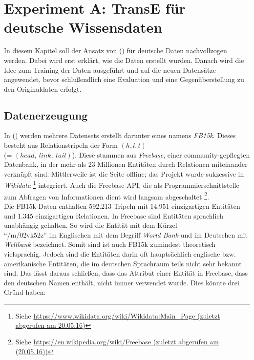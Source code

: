 
\chapter{Experiment A: TransE für deutsche Wissensdaten} %

\label{Chapter6} %


In diesem Kapitel soll der Ansatz von (\cite{bordes2013translating}) für deutsche Daten nachvollzogen werden.
Dabei wird erst erklärt, wie die Daten erstellt wurden. Danach wird die Idee zum Training der Daten ausgeführt und
auf die neuen Datensätze angewendet, bevor schlußendlich eine Evaluation und eine Gegenüberstellung zu den Originaldaten
erfolgt.

\section{Datenerzeugung}

In (\cite{bordes2013translating}) werden mehrere Datensets erstellt darunter eines namens \emph{FB15k}. Dieses
besteht aus Relationstripeln der Form $(h, l, t)$\\
(= $(head,\ link,\ tail)$). Diese stammen aus \emph{Freebase}, einer
community-gepflegten Datenbank, in der mehr als 23 Millionen Entitäten durch Relationen miteinander verknüpft sind.
Mittlerweile ist die Seite offline; das Projekt wurde sukzessive in \emph{Wikidata}
\footnote{Siehe \url{https://www.wikidata.org/wiki/Wikidata:Main_Page (zuletzt abgerufen am 20.05.16)}} integriert. Auch die
Freebase API, die als Programmierschnittstelle zum Abfragen von Informationen dient wird langsam abgeschaltet
\footnote{Siehe \url{https://en.wikipedia.org/wiki/Freebase (zuletzt abgerufen am (20.05.16))}}.\\

Die FB15k-Daten enthalten 592.213 Tripeln mit 14.951 einzigartigen Entitäten und 1.345 einzigartigen Relationen.
In Freebase sind Entitäten sprachlich unabhängig gehalten. So wird die Entität mit dem Kürzel \\``/m/02vk52z''
im Englischen mit dem Begriff \emph{World Bank} und im Deutschen mit \emph{Weltbank} bezeichnet. Somit sind ist auch
FB15k zumindest theoretisch vielsprachig. Jedoch sind die Entitäten darin oft hauptsächlich englische bzw. amerikanische
Entitäten, die im deutschen Sprachraum teils nicht sehr bekannt sind. Das lässt daraus schließen, dass das Attribut einer
Entität in Freebase, dass den deutschen Namen enthält, nicht immer verwendet wurde. Dies könnte drei Gründ haben:

